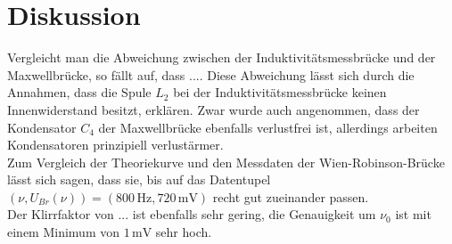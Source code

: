 \section{Diskussion}
\label{sec:Diskussion}
Vergleicht man die Abweichung zwischen der Induktivitätsmessbrücke und der Maxwellbrücke, so fällt auf, dass ....  %
Diese Abweichung lässt sich durch die Annahmen, dass die Spule $L_2$ bei der Induktivitätsmessbrücke keinen Innenwiderstand besitzt, erklären.
Zwar wurde auch angenommen, dass der Kondensator $C_4$ der Maxwellbrücke ebenfalls verlustfrei ist, allerdings arbeiten Kondensatoren prinzipiell verlustärmer. \\

Zum Vergleich der Theoriekurve und den Messdaten der Wien-Robinson-Brücke lässt sich sagen, dass sie, bis auf das Datentupel $(ν, U_{Br}(ν)) = (800 \,\unit{\hertz}, 720 \,\unit{\milli\volt})$ recht gut zueinander passen. \\

Der Klirrfaktor von $...$ ist ebenfalls sehr gering, die Genauigkeit um $ν_0$ ist mit einem Minimum von $1 \,\unit{\milli\volt}$ sehr hoch. 